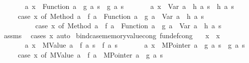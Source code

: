 \begin{isabellebody}
\ \ \ \ \ \ \ {\isachardoublequoteopen}{\isasymAnd}a{\isachardot}{\kern0pt}\ x\ {\isacharequal}{\kern0pt}\ Function\ a\ {\isasymLongrightarrow}\ g\ a\ s\ {\isacharequal}{\kern0pt}\ g{\isacharprime}{\kern0pt}\ a\ s{\isachardoublequoteclose}\isanewline
\ \ \ \ \ \ \ {\isachardoublequoteopen}{\isasymAnd}a{\isachardot}{\kern0pt}\ x\ {\isacharequal}{\kern0pt}\ Var\ a\ {\isasymLongrightarrow}\ h\ a\ s\ {\isacharequal}{\kern0pt}\ h{\isacharprime}{\kern0pt}\ a\ s{\isachardoublequoteclose}\isanewline
\ \ \ \ \ {\isachardoublequoteopen}{\isacharparenleft}{\kern0pt}case\ x\ of\ Method\ a\ {\isasymRightarrow}\ f\ a\ {\isacharbar}{\kern0pt}\ Function\ a\ {\isasymRightarrow}\ g\ a\ {\isacharbar}{\kern0pt}\ Var\ a\ {\isasymRightarrow}\ h\ a{\isacharparenright}{\kern0pt}\ s\isanewline
\ \ \ \ \ \ \ \ \ {\isacharequal}{\kern0pt}\ {\isacharparenleft}{\kern0pt}case\ x{\isacharprime}{\kern0pt}\ of\ Method\ a\ {\isasymRightarrow}\ f{\isacharprime}{\kern0pt}\ a\ {\isacharbar}{\kern0pt}\ Function\ a\ {\isasymRightarrow}\ g{\isacharprime}{\kern0pt}\ a\ {\isacharbar}{\kern0pt}\ Var\ a\ {\isasymRightarrow}\ h{\isacharprime}{\kern0pt}\ a{\isacharparenright}{\kern0pt}\ s{\isachardoublequoteclose}\isanewline
%
\isadelimproof
\ \ %
\endisadelimproof
%
\isatagproof
{}\isamarkupfalse%
\ assms\ \isamarkupfalse%
\ {\isacharparenleft}{\kern0pt}cases\ x{\isacharcomma}{\kern0pt}\ auto{\isacharparenright}{\kern0pt}%
\endisatagproof
{\isafoldproof}%
%
\isadelimproof
\isanewline
%
\endisadelimproof
\isanewline
{}\isamarkupfalse%
\ bind{\isacharunderscore}{\kern0pt}case{\isacharunderscore}{\kern0pt}memoryvalue{\isacharunderscore}{\kern0pt}cong\ {\isacharbrackleft}{\kern0pt}fundef{\isacharunderscore}{\kern0pt}cong{\isacharbrackright}{\kern0pt}{\isacharcolon}{\kern0pt}\isanewline
\ \ \ {\isachardoublequoteopen}x\ {\isacharequal}{\kern0pt}\ x{\isacharprime}{\kern0pt}{\isachardoublequoteclose}\isanewline
\ \ \ \ \ \ \ {\isachardoublequoteopen}{\isasymAnd}a{\isachardot}{\kern0pt}\ x\ {\isacharequal}{\kern0pt}\ MValue\ a\ {\isasymLongrightarrow}\ f\ a\ s\ {\isacharequal}{\kern0pt}\ f{\isacharprime}{\kern0pt}\ a\ s{\isachardoublequoteclose}\isanewline
\ \ \ \ \ \ \ {\isachardoublequoteopen}{\isasymAnd}a{\isachardot}{\kern0pt}\ x\ {\isacharequal}{\kern0pt}\ MPointer\ a\ {\isasymLongrightarrow}\ g\ a\ s\ {\isacharequal}{\kern0pt}\ g{\isacharprime}{\kern0pt}\ a\ s{\isachardoublequoteclose}\isanewline
\ \ \ \ \ {\isachardoublequoteopen}{\isacharparenleft}{\kern0pt}case\ x\ of\ {\isacharparenleft}{\kern0pt}MValue\ a{\isacharparenright}{\kern0pt}\ {\isasymRightarrow}\ f\ a\ {\isacharbar}{\kern0pt}\ {\isacharparenleft}{\kern0pt}MPointer\ a{\isacharparenright}{\kern0pt}\ {\isasymRightarrow}\ g\ a{\isacharparenright}{\kern0pt}\ s\isanewline

\end{isabellebody}
